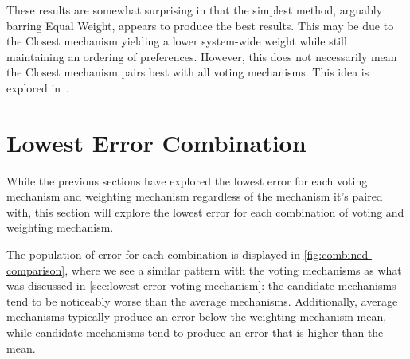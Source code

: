 These results are somewhat surprising in that the simplest method, arguably barring
Equal Weight, appears to produce the best results.
This may be due to the Closest mechanism yielding a lower system-wide weight while
still maintaining an ordering of preferences.
However, this does not necessarily mean the Closest mechanism pairs best with all
voting mechanisms.
This idea is explored in~.


\section{Lowest Error Combination}\label{sec:lowest-error-overall-combination}
While the previous sections have explored the lowest error for each voting mechanism and
weighting mechanism regardless of the mechanism it's paired with, this section will
explore the lowest error for each combination of voting and weighting mechanism.

The population of error for each combination is displayed in
\autoref{fig:combined-comparison}, where we see a similar pattern with the voting
mechanisms as what was discussed in \autoref{sec:lowest-error-voting-mechanism}: the
candidate mechanisms tend to be noticeably worse than the average mechanisms.
Additionally, average mechanisms typically produce an error below the weighting
mechanism mean, while candidate mechanisms tend to produce an error that is higher
than the mean.

